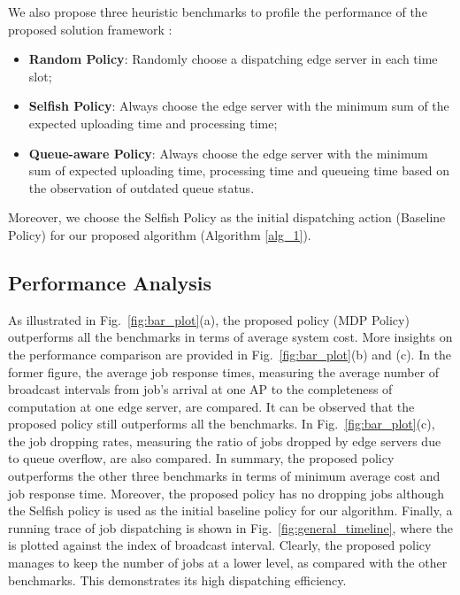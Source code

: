 We also propose {three heuristic benchmarks to profile the performance of the proposed solution framework \algname}:
\begin{itemize}
    \item \textbf{Random Policy}:
            Randomly choose a dispatching edge server in each time slot; 
    \item \textbf{Selfish Policy}:
            Always choose the edge server with the minimum sum of the expected uploading time and processing time;
    \item \textbf{Queue-aware Policy}:
            Always choose the edge server with the minimum sum of expected uploading time, processing time and queueing time based on the observation of outdated queue status.
\end{itemize}
Moreover, we choose the Selfish Policy as the initial dispatching action (Baseline Policy) for our proposed algorithm (Algorithm \ref{alg_1}).

\subsection{Performance Analysis}
\label{subsec:basic}
As illustrated in Fig.~\ref{fig:bar_plot}(a), the proposed policy (MDP Policy) outperforms all the benchmarks in terms of average system cost.
More insights on the performance comparison are provided in Fig.~\ref{fig:bar_plot}(b) and (c).
In the former figure, the average job response times, measuring the average number of broadcast intervals from job's arrival at one AP to the completeness of computation at one edge server, are compared.
It can be observed that the proposed policy still outperforms all the benchmarks.
In Fig.~\ref{fig:bar_plot}(c), the job dropping rates, measuring the ratio of jobs dropped by edge servers due to queue overflow, are also compared.
{In} summary, the proposed policy outperforms {the} other three benchmarks in terms of minimum average cost and job response time.
Moreover, the proposed policy has no dropping jobs although the Selfish policy is used as the initial baseline policy for our algorithm.
Finally, a running trace of job dispatching is shown in Fig.~\ref{fig:general_timeline}, where the  is plotted against the index of broadcast interval.
Clearly, the proposed policy manages to keep the number of jobs at a lower level, as compared with the other benchmarks.
This demonstrates its high dispatching efficiency.

